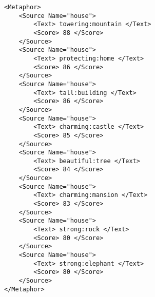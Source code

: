 

\lstset{language=XML}
\begin{lstlisting}[caption= Ejemplo formatos XML Metaphor Magnet para la palabra \textit{house}, label={lst:xmlmetaphormagnet}, frame=single]
<Metaphor>
	<Source Name="house">
		<Text> towering:mountain </Text>
		<Score> 88 </Score>
	</Source>
	<Source Name="house">
		<Text> protecting:home </Text>
		<Score> 86 </Score>
	</Source>
	<Source Name="house">
		<Text> tall:building </Text>
		<Score> 86 </Score>
	</Source>
	<Source Name="house">
		<Text> charming:castle </Text>
		<Score> 85 </Score>
	</Source>
	<Source Name="house">
		<Text> beautiful:tree </Text>
		<Score> 84 </Score>
	</Source>
	<Source Name="house">
		<Text> charming:mansion </Text>
		<Score> 83 </Score>
	</Source>
	<Source Name="house">
		<Text> strong:rock </Text>
		<Score> 80 </Score>
	</Source>
	<Source Name="house">
		<Text> strong:elephant </Text>
		<Score> 80 </Score>
	</Source>
</Metaphor>
\end{lstlisting}




